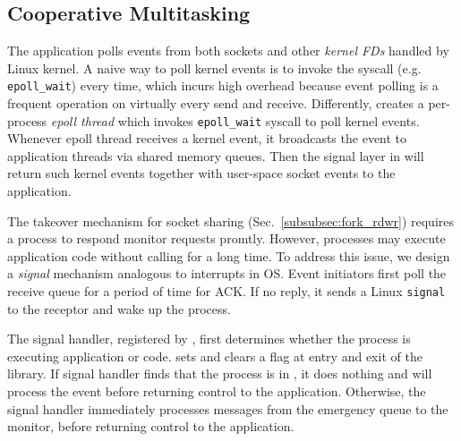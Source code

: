 \subsection{Cooperative Multitasking}
\label{subsec:process-mux}

The application polls events from both sockets and other \textit{kernel FDs} handled by Linux kernel.
A naive way to poll kernel events is to invoke the syscall (e.g. \texttt{epoll\_wait}) every time, which incurs high overhead because event polling is a frequent operation on virtually every send and receive.
Differently, \libipc{} creates a per-process \textit{epoll thread} which invokes \texttt{epoll\_wait} syscall to poll kernel events. Whenever epoll thread receives a kernel event, it broadcasts the event to application threads via shared memory queues. Then the signal layer in \libipc{} will return such kernel events together with user-space socket events to the application.

The takeover mechanism for socket sharing (Sec.~\ref{subsubsec:fork_rdwr}) requires a process to respond monitor requests promtly. However, processes may execute application code without calling \libipc{} for a long time. To address this issue, we design a \textit{signal} mechanism analogous to interrupts in OS. Event initiators  first poll the receive queue for a period of time for ACK. If no reply, it sends a Linux \texttt{signal} to the receptor and wake up the process.

The signal handler, registered by \libipc{}, first determines whether the process is executing application or \libipc{} code. \libipc{} sets and clears a flag at entry and exit of the library. If signal handler finds that the process is in \libipc, it does nothing and \libipc{} will process the event before returning control to the application. Otherwise, the signal handler immediately processes messages from the emergency queue to the monitor, before returning control to the application. 

